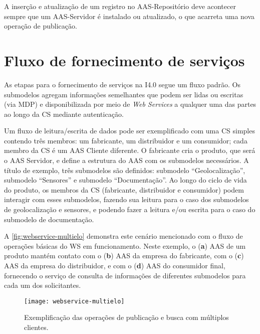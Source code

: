 A inserção e atualização de um registro no AAS-Repositório deve acontecer sempre que um AAS-Servidor é instalado ou atualizado, o que acarreta uma nova operação de publicação.


\section{Fluxo de fornecimento de serviços}

As etapas para o fornecimento de serviços na I4.0 segue um fluxo padrão. Os submodelos agregam informações semelhantes que podem ser lidas ou escritas (via MDP) e disponibilizada por meio de \textit{Web Services} a qualquer uma das partes ao longo da CS mediante autenticação.

Um fluxo de leitura/escrita de dados pode ser exemplificado com uma CS simples contendo três membros: um fabricante, um distribuidor e um consumidor; cada membro da CS é um AAS Cliente diferente. O fabricante cria o produto, que será o AAS Servidor, e define a estrutura do AAS com os submodelos necessários. A título de exemplo, três submodelos são definidos: submodelo ``Geolocalização'', submodelo ``Sensores'' e submodelo ``Documentação''. Ao longo do ciclo de vida do produto, os membros da CS (fabricante, distribuidor e consumidor) podem interagir com esses submodelos, fazendo sua leitura para o caso dos submodelos de geolocalização e sensores, e podendo fazer a leitura e/ou escrita para o caso do submodelo de documentação.

A \autoref{fig:webservice-multielo} demonstra este cenário mencionado com o fluxo de operações básicas do WS em funcionamento. Neste exemplo, o (\textbf{a}) AAS de um produto mantém contato com o (\textbf{b}) AAS da empresa do fabricante, com o (\textbf{c}) AAS da empresa do distribuidor, e com o (\textbf{d}) AAS do consumidor final, fornecendo o serviço de consulta de informações de diferentes submodelos para cada um dos solicitantes.

\begin{figure}[htb]
	\centering
	\texttt{[image: webservice-multielo]}
	\caption{Exemplificação das operações de publicação e busca com múltiplos clientes.}
	\label{fig:webservice-multielo}
\end{figure}

